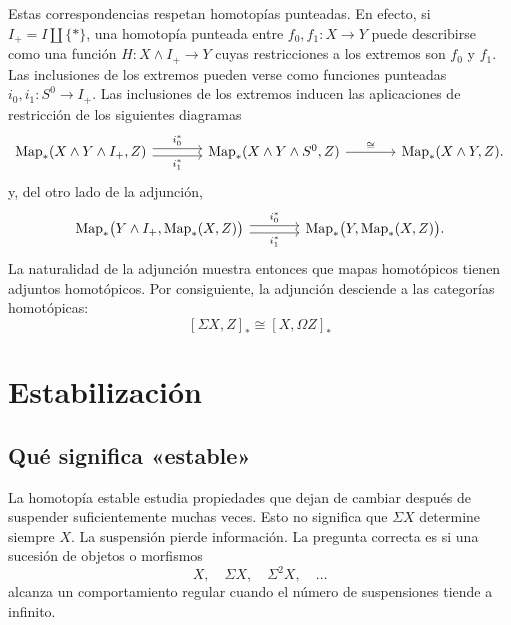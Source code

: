 Estas correspondencias respetan homotopías punteadas. En efecto, si \(I_+=I\amalg\{*\}\), una homotopía punteada entre \(f_0,f_1\colon X\to Y\) puede describirse como una función
\(
H\colon X\wedge I_+\longrightarrow Y
\)
cuyas restricciones a los extremos son \(f_0\) y \(f_1\). Las inclusiones de los extremos pueden verse como funciones punteadas \(i_0,i_1\colon S^0\longrightarrow I_+\). Las inclusiones de los extremos inducen las aplicaciones de restricción de los siguientes diagramas
\[
\begin{tikzcd}[column sep=large]
\Map_*(X\wedge Y\wedge I_+,Z)
\arrow[r, shift left=.6ex, "i_0^*"]
\arrow[r, shift right=.6ex, swap, "i_1^*"]
&
\Map_*(X\wedge Y\wedge S^0,Z)
\arrow[r, "\cong"]
&
\Map_*(X\wedge Y,Z).
\end{tikzcd}
\]
y, del otro lado de la adjunción,
\[
\begin{tikzcd}[column sep=large]
\Map_*\bigl(Y\wedge I_+,\Map_*(X,Z)\bigr)
\arrow[r, shift left=.6ex, "i_0^*"]
\arrow[r, shift right=.6ex, swap, "i_1^*"]
&
\Map_*\bigl(Y,\Map_*(X,Z)\bigr).
\end{tikzcd}
\]
La naturalidad de la adjunción muestra entonces que mapas homotópicos tienen adjuntos homotópicos. Por consiguiente, la adjunción desciende a las categorías homotópicas:
\[
[\Sigma X,Z]_*\cong[X,\Omega Z]_*
\]

\section{Estabilización}

\subsection{Qué significa «estable»}

La homotopía estable estudia propiedades que dejan de cambiar después de suspender suficientemente muchas veces.
Esto no significa que \(\Sigma X\) determine siempre \(X\). La suspensión pierde información. La pregunta correcta es si una sucesión de objetos o morfismos
\[
X,\quad \Sigma X,\quad \Sigma^2X,\quad \ldots
\]
alcanza un comportamiento regular cuando el número de suspensiones tiende a infinito.

